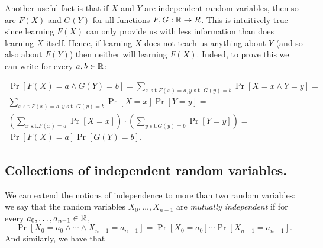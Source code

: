 Another useful fact is that if \(X\) and \(Y\) are independent random
variables, then so are \(F(X)\) and \(G(Y)\) for all functions
\(F,G:{\mathbb{R}} \rightarrow R\). This is intuitively true since learning
\(F(X)\) can only provide us with less information than does learning
\(X\) itself. Hence, if learning \(X\) does not teach us anything about
\(Y\) (and so also about \(F(Y)\)) then neither will learning \(F(X)\).
Indeed, to prove this we can write for every \(a,b \in {\mathbb{R}}\):

\[
\begin{gathered}
\Pr[ F(X)=a \wedge G(Y)=b ] = \sum_{x \text{ s.t.} F(x)=a, y \text{ s.t. } G(y)=b} \Pr[ X=x \wedge Y=y ] = \\
\sum_{x \text{ s.t.} F(x)=a, y \text{ s.t. } G(y)=b} \Pr[ X=x ] \Pr[  Y=y ]  = \\
\left( \sum_{x \text{ s.t.} F(x)=a } \Pr[X=x ] \right) \cdot \left( \sum_{y \text{ s.t.} G(y)=b } \Pr[Y=y ] \right) = \\
\Pr[ F(X)=a] \Pr[G(Y)=b] .
\end{gathered}
\]

\subsection{Collections of independent random
variables.}\label{Collections-of-independent-ran}

We can extend the notions of independence to more than two random
variables: we say that the random variables \(X_0,\ldots,X_{n-1}\) are
\emph{mutually independent} if for every \(a_0,\ldots,a_{n-1} \in {\mathbb{R}}\),
\[
\Pr\left[X_0=a_0 \wedge \cdots \wedge X_{n-1}=a_{n-1}\right]=\Pr[X_0=a_0]\cdots \Pr[X_{n-1}=a_{n-1}] .
\] And similarly, we have that

\hypertarget{expprod}{}

\hypertarget{indeplem}{}

